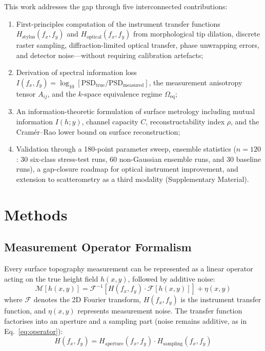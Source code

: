 \documentclass[review,12pt]{elsarticle}
\begin{document}
This work addresses the gap through five interconnected contributions:
\begin{enumerate}
    \item First-principles computation of the instrument transfer functions $H_\mathrm{stylus}(f_x,f_y)$ and $H_\mathrm{optical}(f_x,f_y)$ from morphological tip dilation, discrete raster sampling, diffraction-limited optical transfer, phase unwrapping errors, and detector noise---without requiring calibration artefacts;
    \item Derivation of spectral information loss $I(f_x,f_y) = \log_{10}[\mathrm{PSD}_\mathrm{true}/\mathrm{PSD}_\mathrm{measured}]$, the measurement anisotropy tensor $A_{ij}$, and the $k$-space equivalence regime $\Omega_\mathrm{eq}$;
    \item An information-theoretic formulation of surface metrology including mutual information $ I(h;y)$, channel capacity $C$, reconstructability index $\rho$, and the Cram\'{e}r--Rao lower bound on surface reconstruction;
    \item Validation through a 180-point parameter sweep, ensemble statistics ($n=120$: 30 six-class stress-test runs, 60 non-Gaussian ensemble runs, and 30 baseline runs), a gap-closure roadmap for optical instrument improvement, and extension to scatterometry as a third modality (Supplementary Material).
\end{enumerate}

\section{Methods}

\subsection{Measurement Operator Formalism}
\label{sec:operator}

Every surface topography measurement can be represented as a linear operator acting on the true height field $h(x,y)$, followed by additive noise:
\begin{equation}
    \mathcal{M}[h(x,y)] = \mathcal{F}^{-1}\!\left[H(f_x,f_y) \cdot \mathcal{F}[h(x,y)]\right] + \eta(x,y)
    \label{eq:operator}
\end{equation}
where $\mathcal{F}$ denotes the 2D Fourier transform, $ H(f_x,f_y)$ is the instrument transfer function, and $\eta(x,y)$ represents measurement noise. The transfer function factorises into an aperture and a sampling part (noise remains additive, as in Eq.~\ref{eq:operator}):
\begin{equation}
    H(f_x,f_y) = H_\mathrm{aperture}(f_x,f_y) \cdot H_\mathrm{sampling}(f_x,f_y)
    \label{eq:factorisation}
\end{equation}
\end{document}
